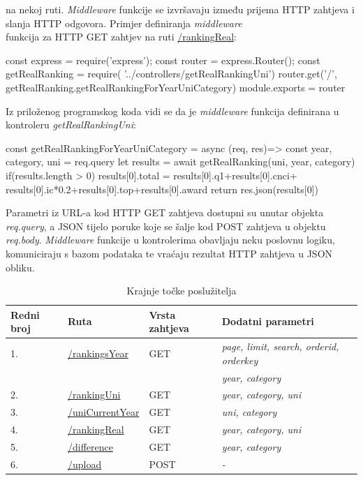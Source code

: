 \documentclass[times, utf8, zavrsni]{fer}
\begin{document}
na nekoj ruti.
\emph{Middleware} funkcije se izvršavaju između prijema HTTP zahtjeva i slanja HTTP odgovora. Primjer definiranja \emph{middleware}
\\funkcija za HTTP GET zahtjev na ruti \url{/rankingReal}:
\begin{verbnobox}[\fontsize{10pt}{10pt}\selectfont]  
const express = require('express');
const router = express.Router();
const getRealRanking = require(
            '../controllers/getRealRankingUni')
router.get('/', 
    getRealRanking.getRealRankingForYearUniCategory)
module.exports = router
\end{verbnobox}  
Iz priloženog programskog koda vidi se da je \emph{middleware} funkcija definirana u kontroleru \emph{getRealRankingUni}:
\begin{verbnobox}[\fontsize{10pt}{10pt}\selectfont] 
const getRealRankingForYearUniCategory = async (req, res)=>{
    const{ year, category, uni } = req.query
    let results = await getRealRanking(uni, year, category)
    if(results.length > 0){
        results[0].total = results[0].q1+results[0].cnci+
        results[0].ic*0.2+results[0].top+results[0].award
    }
    return res.json(results[0])
}
\end{verbnobox} 
Parametri iz URL-a kod HTTP GET zahtjeva dostupni su unutar objekta \emph{req.query}, a JSON tijelo poruke koje se šalje kod POST zahtjeva u objektu \emph{req.body}.
\emph{Middleware} funkcije u kontrolerima obavljaju neku poslovnu logiku, komuniciraju s bazom podataka te vraćaju rezultat HTTP zahtjeva u JSON obliku.
\begin{table}[htb]
    \caption{Krajnje točke poslužitelja}
        \label{tbl:endpoints}
        \centering
        \begin{tabular}{llll} \hline
        Redni broj & Ruta & Vrsta zahtjeva & Dodatni parametri\\ \hline
        1. & \url{/rankingsYear} & GET & \emph{page, limit, search, orderid, orderkey} \\
        &&&\emph{year, category}
        \\2. & \url{/rankingUni} & GET & \emph{year, category, uni}
        \\3. & \url{/uniCurrentYear} & GET & \emph{uni, category}
        \\4. & \url{/rankingReal} & GET & \emph{year, category, uni}
        \\5. & \url{/difference} & GET & \emph{ year, category}
        \\6. & \url{/upload} & POST & \emph{-}
        \end{tabular}
        \end{table} 
\end{document}
